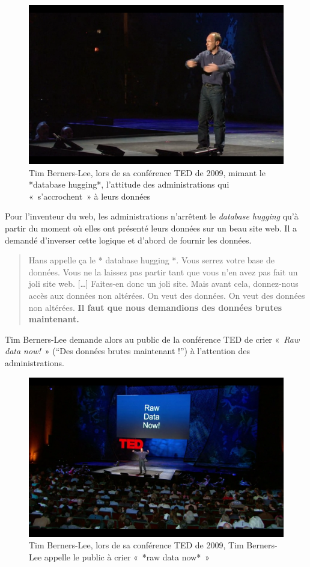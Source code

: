 \documentclass[]{book}
\theoremstyle{definition}
\theoremstyle{definition}
\theoremstyle{definition}
\theoremstyle{remark}
\begin{document}
\begin{figure}

{\centering \includegraphics[width=0.7\linewidth]{./img/hug} 

}

\caption{Tim Berners-Lee, lors de sa conférence TED de 2009, mimant le *database hugging*, l’attitude des administrations qui « s’accrochent » à leurs données}\label{fig:unnamed-chunk-2}
\end{figure}

Pour l'inventeur du web, les administrations n'arrêtent le
\emph{database hugging} qu'à partir du moment où elles ont présenté
leurs données sur un beau site web. Il a demandé d'inverser cette
logique et d'abord de fournir les données.

\begin{quote}
Hans appelle ça le * database hugging *. Vous serrez votre base de
données. Vous ne la laissez pas partir tant que vous n'en avez pas fait
un joli site web. {[}\ldots{}{]} Faites-en donc un joli site. Mais avant
cela, donnez-nous accès aux données non altérées. On veut des données.
On veut des données non altérées. \textbf{Il faut que nous demandions
des données brutes maintenant.}
\end{quote}

Tim Berners-Lee demande alors au public de la conférence TED de crier
«~\emph{Raw data now!}~» (``Des données brutes maintenant !'') à
l'attention des administrations.

\begin{figure}

{\centering \includegraphics[width=0.7\linewidth]{./img/raw} 

}

\caption{Tim Berners-Lee, lors de sa conférence TED de 2009, Tim Berners-Lee appelle le public à crier « *raw data now* »}\label{fig:unnamed-chunk-3}
\end{figure}
\end{document}
